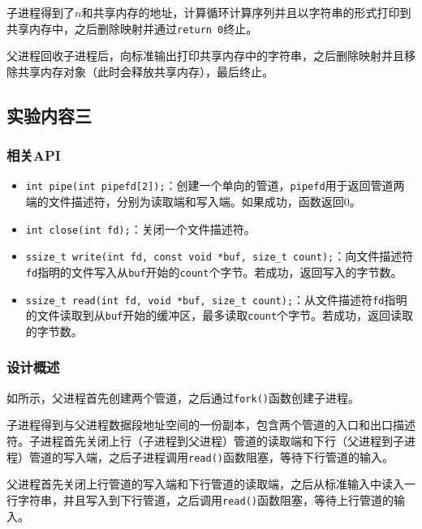 \documentclass[lang=cn,11pt,a4paper,cite=authornum]{paper}
\begin{document}
子进程得到了$n$和共享内存的地址，计算循环计算序列并且以字符串的形式打印到共享内存中，之后删除映射并通过\texttt{return 0}终止。

父进程回收子进程后，向标准输出打印共享内存中的字符串，之后删除映射并且移除共享内存对象（此时会释放共享内存），最后终止。

\subsection{实验内容三}

\subsubsection{相关API}

\begin{itemize}
    \item \texttt{int pipe(int pipefd[2]);}：创建一个单向的管道，\texttt{pipefd}用于返回管道两端的文件描述符，分别为读取端和写入端。如果成功，函数返回0。
    \item \texttt{int close(int fd);}：关闭一个文件描述符。
    \item \texttt{ssize_t write(int fd, const void *buf, size_t count);}：向文件描述符\texttt{fd}指明的文件写入从\texttt{buf}开始的\texttt{count}个字节。若成功，返回写入的字节数。
    \item \texttt{ssize_t read(int fd, void *buf, size_t count);}：从文件描述符\texttt{fd}指明的文件读取到从\texttt{buf}开始的缓冲区，最多读取\texttt{count}个字节。若成功，返回读取的字节数。
\end{itemize}

\subsubsection{设计概述}

如所示，父进程首先创建两个管道，之后通过\texttt{fork()}函数创建子进程。

子进程得到与父进程数据段地址空间的一份副本，包含两个管道的入口和出口描述符。子进程首先关闭上行（子进程到父进程）管道的读取端和下行（父进程到子进程）管道的写入端，之后子进程调用\texttt{read()}函数阻塞，等待下行管道的输入。

父进程首先关闭上行管道的写入端和下行管道的读取端，之后从标准输入中读入一行字符串，并且写入到下行管道，之后调用\texttt{read()}函数阻塞，等待上行管道的输入。
\end{document}
